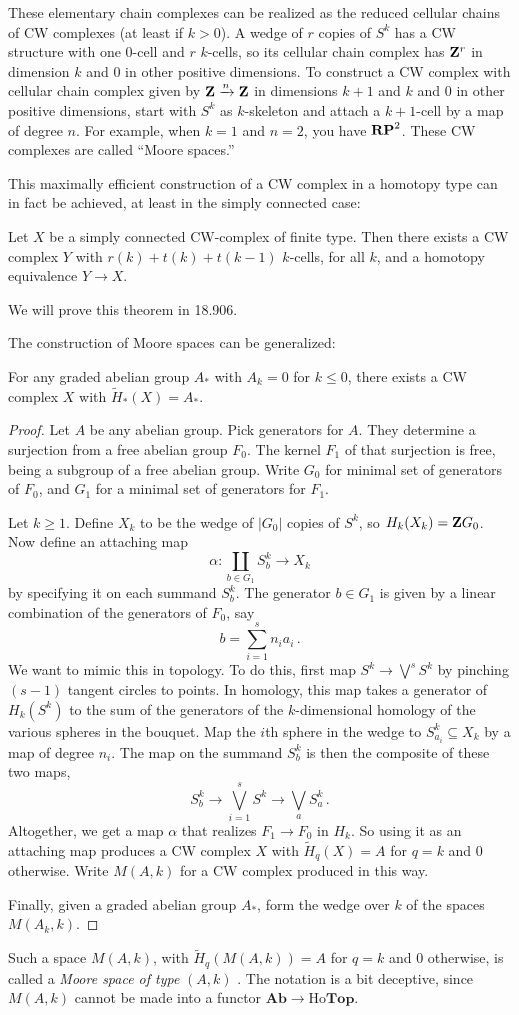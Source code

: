 These elementary chain complexes can be realized as the reduced cellular chains of CW complexes (at least if $k>0$). A wedge of $r$ copies of $S^k$ has a CW structure with one $0$-cell and $r$ $k$-cells, so its cellular chain complex 
has  $\mathbf Z^r$ in dimension $k$ and 0 in other positive dimensions.
To construct a CW complex with cellular chain complex given by $\mathbf Z\xrightarrow{n}\mathbf Z$ in dimensions $k+1$ and $k$ and $0$ in other positive dimensions, 
start with $S^k$ as $k$-skeleton and attach a $k+1$-cell 
by a map of degree $n$. For example, when $k=1$ and $n=2$, you have $\mathbf{RP}^2$. 
These CW complexes are called ``Moore spaces.'' 

This maximally efficient construction of a CW complex in a homotopy type
can in fact be achieved, at least in the simply connected case:

\begin{theorem}
Let $X$ be a simply connected CW-complex of finite type. Then there exists a CW complex $Y$ with $r(k)+t(k)+t(k-1)$ $k$-cells, for all $k$, and a homotopy equivalence $Y\to X$.
\end{theorem}

We will prove this theorem in 18.906.

The construction of Moore spaces can be generalized:
\begin{prop} For any graded abelian group $A_*$ with $A_k=0$ for $k\leq0$, 
there exists a CW complex $X$ with $\widetilde H_*(X)=A_*$.
\end{prop}
\begin{proof}
Let $A$ be any abelian group. Pick generators for $A$. 
They determine a surjection
from a free abelian group $F_0$. The kernel $F_1$ of that surjection is free,
being a subgroup of a free abelian group. Write $G_0$ for minimal set of
generators of $F_0$, and $G_1$ for a minimal set of generators for $F_1$.

Let $k\geq1$. Define $X_k$ to be the wedge of $|G_0|$ copies of $S^k$,
so $H_k(X_k)=\mathbf Z G_0$. Now define an attaching map 
\[
\alpha:\coprod_{b\in G_1} S^k_b\to X_k
\]
by specifying it on each summand $S^k_b$. The generator 
$b\in G_1$ is given by a linear combination of the generators
of $F_0$, say 
\[
b=\sum_{i=1}^s n_ia_i\,.
\]
We want to mimic this in topology. To do this, first
map $S^k\to\bigvee^s S^k$ by pinching $(s-1)$ tangent circles to points. 
In homology, this map takes a generator of $H_k(S^k)$ to the sum of the
generators of the $k$-dimensional homology of the various spheres in the
bouquet.
Map the $i$th sphere in the wedge to $S^k_{a_i}\subseteq X_k$ by a map of
degree $n_i$. The map on the summand $S^k_b$ is then the composite of these 
two maps,
\[
S^k_b\to\bigvee_{i=1}^s S^k\to\bigvee_a S^k_a\,.
\]
Altogether, we get a map $\alpha$ that realizes $F_1\to F_0$ in $H_k$.
So using it as an attaching map produces a CW complex $X$ with 
$\widetilde H_q(X)=A$ for $q=k$ and 0 otherwise. Write $M(A,k)$ for 
a CW complex produced in this way.

Finally, given a graded abelian group $A_*$, form the wedge over $k$ of the
spaces $M(A_k,k)$. 
\end{proof}

Such a space $M(A,k)$, with $\widetilde H_q(M(A,k))=A$ for $q=k$ and 0 
otherwise, is called a {\em Moore space of type} $(A,k)$ \cite{moore}. 
The notation is a bit deceptive, since $M(A,k)$ cannot be made into a functor
$\mathbf{Ab}\to\mathrm{Ho}\mathbf{Top}$.


